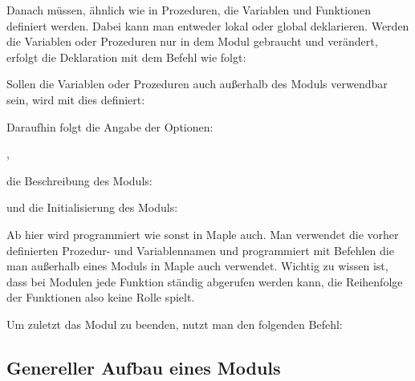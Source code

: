 \medskip



\medskip

Danach müssen, ähnlich wie in Prozeduren, die Variablen und Funktionen definiert werden. Dabei kann man entweder lokal oder global deklarieren. Werden die Variablen oder Prozeduren nur in dem Modul gebraucht und verändert, erfolgt die Deklaration mit dem Befehl   wie folgt:

\medskip

\begin{alltt}
\end{alltt}
\medskip

Sollen die Variablen oder Prozeduren auch außerhalb des Moduls verwendbar sein, wird mit  dies definiert:


\medskip


\medskip


Daraufhin folgt die Angabe der Optionen:

,

die Beschreibung des Moduls:


und die Initialisierung des Moduls:


\begin{alltt}
\end{alltt} 

Ab hier wird programmiert wie sonst in Maple auch. Man verwendet die vorher definierten Prozedur- und Variablennamen und programmiert mit Befehlen die man außerhalb eines Moduls in Maple auch verwendet. Wichtig zu wissen ist, dass bei Modulen jede Funktion ständig abgerufen werden kann, die Reihenfolge der Funktionen also keine Rolle spielt. 

\medskip

Um zuletzt das Modul zu beenden, nutzt man den folgenden Befehl:

\medskip


\subsection{Genereller Aufbau eines Moduls}

